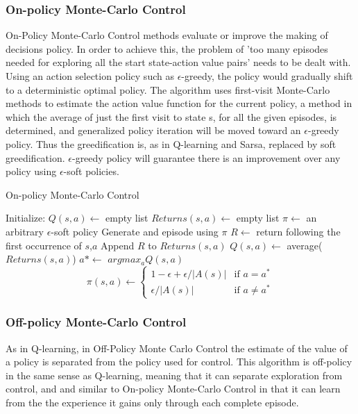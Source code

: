 \documentclass[11pt]{article}
\begin{document}
\subsubsection{On-policy Monte-Carlo Control}
On-Policy Monte-Carlo Control methods evaluate or improve the making of decisions policy. In order to achieve this, the problem of 'too many episodes needed for exploring all the start state-action value pairs' needs to be dealt with. Using an action selection policy such as $\epsilon$-greedy, the policy would gradually shift to a deterministic optimal policy. The algorithm uses first-visit Monte-Carlo methods to estimate the action value function for the current policy, a method in which the average of just the first visit to state s, for all the given episodes, is determined, and generalized policy iteration will be moved toward an $\epsilon$-greedy policy. Thus the greedification is, as in Q-learning and Sarsa, replaced by soft greedification. $\epsilon$-greedy policy will guarantee there is an improvement over any policy using $\epsilon$-soft policies.

\begin{algorithm}
\caption{On-policy Monte-Carlo Control}
\begin{algorithmic}[1]
\label{onpmc}
\STATE Initialize:
\STATE $Q(s,a) \leftarrow$ empty list
\STATE $Returns(s,a) \leftarrow$ empty list
\STATE $\pi \leftarrow$ an arbitrary $\epsilon$-soft policy
\LOOP
\STATE Generate and episode using $\pi$ 
\STATE $R \leftarrow$ return following the first occurrence of $s$,$a$
\STATE Append $R$ to $Returns(s,a)$
\STATE $Q(s,a) \leftarrow$ average($Returns(s,a)$)
\ENDFOR
{}
\STATE $a* \leftarrow$ $arg max_aQ(s,a)$
\STATE 
\begin{equation}
  \pi(s,a) \leftarrow 
  \begin{cases}
    1 - \epsilon + \epsilon/ \left|A(s)\right| & \text{if $a=a^*$}\\  
    \epsilon/ \left|A(s)\right| & \text{if $a \neq a^*$}
  \end{cases}
\end{equation}
\ENDFOR
\ENDFOR
\ENDLOOP
\ENDFOR
\end{algorithmic}
\end{algorithm}

\subsubsection{Off-policy Monte-Carlo Control}
As in Q-learning, in Off-Policy Monte Carlo Control the estimate of the value of a policy is separated from the policy used for control. This algorithm is off-policy in the same sense as Q-learning, meaning that it can separate exploration from control, and and similar to On-policy Monte-Carlo Control in that it can learn from the the experience it gains only through each complete episode.
\end{document}
